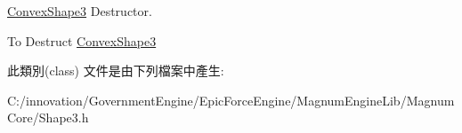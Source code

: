 \hyperlink{class_i_dream_sky_1_1_convex_shape3}{Convex\+Shape3} Destructor. 

To Destruct \hyperlink{class_i_dream_sky_1_1_convex_shape3}{Convex\+Shape3} 

此類別(class) 文件是由下列檔案中產生\+:\begin{DoxyCompactItemize}
\item 
C\+:/innovation/\+Government\+Engine/\+Epic\+Force\+Engine/\+Magnum\+Engine\+Lib/\+Magnum\+Core/Shape3.\+h\end{DoxyCompactItemize}
